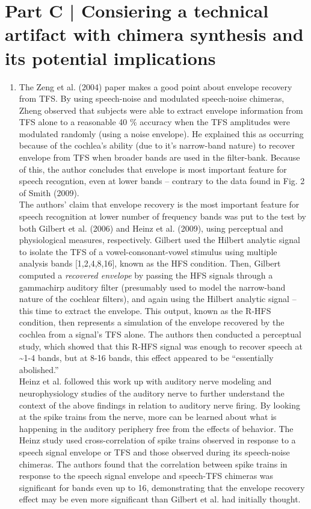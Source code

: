 \documentclass[9pt]{extarticle}
\begin{document}
\newpage
\section{Part C | Consiering a technical artifact with chimera synthesis and its potential implications} 

\begin{enumerate}[label = \alph*)]
\item The Zeng et al. (2004) paper makes a good point about envelope recovery from TFS. By using speech-noise and modulated speech-noise chimeras, Zheng observed that subjects were able to extract envelope information from TFS alone to a reasonable 40 \% accuracy when the TFS amplitudes were modulated randomly (using a noise envelope). He explained this as occurring because of the cochlea's ability (due to it's narrow-band nature) to recover envelope from TFS when broader bands are used in the filter-bank. Because of this, the author concludes that envelope is most important feature for speech recogntion, even at lower bands -- contrary to the data found in Fig. 2 of Smith (2009).\\

The authors' claim that envelope recovery is the most important feature for speech recognition at lower number of frequency bands was put to the test by both Gilbert et al. (2006) and Heinz et al. (2009), using perceptual and physiological measures, respectively. Gilbert used the Hilbert analytic signal to isolate the TFS of a vowel-consonant-vowel stimulus using multiple analysis bands [1,2,4,8,16], known as the HFS condition. Then, Gilbert computed a \textit{recovered envelope} by passing the HFS signals through a gammachirp auditory filter (presumably used to model the narrow-band nature of the cochlear filters), and again using the Hilbert analytic signal -- this time to extract the envelope. This output, known as the R-HFS condition, then represents a simulation of the envelope recovered by the cochlea from a signal's TFS alone. The authors then conducted a perceptual study, which showed that this R-HFS signal was enough to recover speech at \textasciitilde 1-4 bands, but at 8-16 bands, this effect appeared to be ``essentially abolished.''\\

Heinz et al. followed this work up with auditory nerve modeling and neurophysiology studies of the auditory nerve to further understand the context of the above findings in relation to auditory nerve firing. By looking at the spike trains from the nerve, more can be learned about what is happening in the auditory periphery free from the effects of behavior. The Heinz study used cross-correlation of spike trains observed in response to a speech signal envelope or TFS and those observed during its speech-noise chimeras. The authors found that the correlation between spike trains in response to the speech signal envelope and speech-TFS chimeras was significant for bands even up to 16, demonstrating that the envelope recovery effect may be even more significant than Gilbert et al. had initially thought.\\


\end{enumerate}
\end{document}
